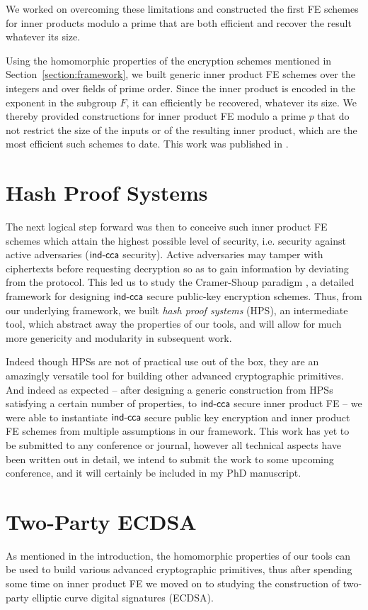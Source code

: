 \documentclass[11pt]{llncs}
\begin{document}
We worked on overcoming these limitations and constructed the first FE schemes for inner products modulo a prime that are both efficient and recover the result whatever its size.

Using the homomorphic properties of the encryption schemes mentioned in Section~\ref{section:framework}, we built generic inner product FE schemes over the integers and over fields of prime order. Since the inner product is encoded in the exponent in the subgroup $F$, it can efficiently be recovered, whatever its size. 
We thereby provided constructions for inner product FE modulo a prime $p$ that do not restrict the size of the inputs or of the resulting inner product, which are the most efficient such schemes to date.
This work was published in \cite{AC:CasLagTuc18}.

\section{Hash Proof Systems}
The next logical step forward was then to conceive such inner product FE schemes which attain the highest possible level of security, i.e. security against active adversaries ($\mathsf{ind\mbox{-}cca}$ security). Active adversaries may tamper with ciphertexts before requesting decryption so as to gain information by deviating from the protocol.
%
This led us to study the Cramer-Shoup paradigm \cite{EC:CraSho02}, a detailed framework for designing $\mathsf{ind\mbox{-}cca}$ secure public-key encryption schemes.
Thus, from our underlying framework, we built \textit{hash proof systems} (HPS), an intermediate tool, which abstract away the properties of our tools, and will allow for much more genericity and modularity in subsequent work.

Indeed though HPSs are not of practical use out of the box, they are an amazingly versatile tool for building other advanced cryptographic primitives. And indeed as expected -- after designing a generic construction from HPSs satisfying a certain number of properties, to $\mathsf{ind\mbox{-}cca}$ secure inner product FE -- we were able to instantiate $\mathsf{ind\mbox{-}cca}$ secure public key encryption and inner product FE schemes from multiple assumptions in our framework. This work has yet to be submitted to any conference or journal, however all technical aspects have been written out in detail, we intend to submit the work to some upcoming conference, and it will certainly be included in my PhD manuscript.

\section{Two-Party ECDSA}
As mentioned in the introduction, the homomorphic properties of our tools can be used to build various advanced cryptographic primitives, thus after spending some time on inner product FE we moved on to studying the construction of two-party elliptic curve digital signatures (ECDSA).
\end{document}
